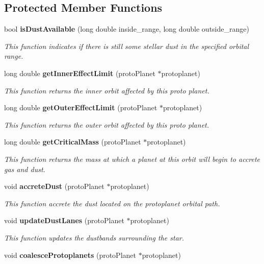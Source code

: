 \subsection*{Protected Member Functions}
\begin{CompactItemize}
\item 
bool {\bf is\-Dust\-Available} (long double inside\_\-range, long double outside\_\-range)
\begin{CompactList}\small\item\em This function indicates if there is still some stellar dust in the specified orbital range. \item\end{CompactList}\item 
long double {\bf get\-Inner\-Effect\-Limit} (proto\-Planet $\ast$protoplanet)
\begin{CompactList}\small\item\em This function returns the inner orbit affected by this proto planet. \item\end{CompactList}\item 
long double {\bf get\-Outer\-Effect\-Limit} (proto\-Planet $\ast$protoplanet)
\begin{CompactList}\small\item\em This function returns the outer orbit affected by this proto planet. \item\end{CompactList}\item 
long double {\bf get\-Critical\-Mass} (proto\-Planet $\ast$protoplanet)
\begin{CompactList}\small\item\em This function returns the mass at which a planet at this orbit will begin to accrete gas and dust. \item\end{CompactList}\item 
void {\bf accrete\-Dust} (proto\-Planet $\ast$protoplanet)
\begin{CompactList}\small\item\em This function accrete the dust located on the protoplanet orbital path. \item\end{CompactList}\item 
void {\bf update\-Dust\-Lanes} (proto\-Planet $\ast$protoplanet)
\begin{CompactList}\small\item\em This function updates the dustbands surrounding the star. \item\end{CompactList}\item 
void {\bf coalesce\-Protoplanets} (proto\-Planet $\ast$protoplanet)\label{class_s_g___stardust_b6}


\end{CompactItemize}
